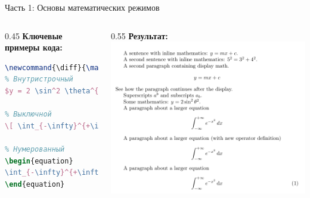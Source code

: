 \documentclass[aspectratio=169]{beamer}
\begin{document}
\begin{frame}[fragile]{Часть 1: Основы математических режимов}
    \begin{columns}[T]
        \begin{column}{0.45\textwidth}
            \textbf{Ключевые примеры кода:}
            \begin{lstlisting}[language=tex]
\newcommand{\diff}{\mathop{}\!\mathrm{d}} % For upright
% Внутристрочный
$y = 2 \sin^2 \theta^{2}$

% Выключной
\[ \int_{-\infty}^{+\infty} e^{-x^2} dx \]

% Нумерованный
\begin{equation}
\int_{-\infty}^{+\infty} e^{-x^2} \diff x
\end{equation}
            \end{lstlisting}
        \end{column}
        \begin{column}{0.55\textwidth}
            \textbf{Результат:}
            \includegraphics[width=\textwidth, height=0.7\textheight, keepaspectratio]{image/1.png}
        \end{column}
    \end{columns}
\end{frame}
\end{document}
